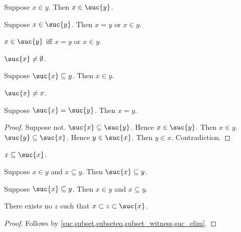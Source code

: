 \begin{proposition}\label{suc_intro_in}
    Suppose $x\in y$. Then $x\in\suc{y}$.
\end{proposition}

\begin{proposition}\label{suc_elim}
    Suppose $x\in\suc{y}$.
    Then $x = y$ or $x\in y$.
\end{proposition}

\begin{proposition}\label{suc_iff}
    $x\in\suc{y}$ iff $x = y$ or $x\in y$.
\end{proposition}

\begin{proposition}\label{suc_neq_emptyset}
    $\suc{x}\neq \emptyset$.
\end{proposition}

\begin{proposition}\label{suc_subseteq_implies_in}
    Suppose $\suc{x}\subseteq y$. Then $x\in y$.
\end{proposition}

\begin{proposition}\label{suc_neq_self}
    $\suc{x}\neq x$.
\end{proposition}

\begin{proposition}\label{suc_injective}
    Suppose $\suc{x} = \suc{y}$. Then $x = y$.
\end{proposition}
\begin{proof}
    Suppose not.
    $\suc{x}\subseteq \suc{y}$. Hence $x\in\suc{y}$.
    Then $x\in y$.
    $\suc{y}\subseteq \suc{x}$. Hence $y\in\suc{x}$.
    Then $y\in x$.
    Contradiction.
\end{proof}

\begin{proposition}\label{subseteq_self_suc_intro}
    $x\subseteq\suc{x}$.
\end{proposition}

\begin{proposition}\label{suc_subseteq_intro}
    Suppose $x\in y$ and $x\subseteq y$.
    Then $\suc{x}\subseteq y$.
\end{proposition}

\begin{proposition}\label{suc_subseteq_elim}
    Suppose $\suc{x}\subseteq y$.
    Then $x\in y$ and $x\subseteq y$.
\end{proposition}

\begin{proposition}\label{suc_next_subset}
    There exists no $z$ such that $x\subset z\subset \suc{x}$.
\end{proposition}
\begin{proof}
    Follows by \cref{suc,subset,subseteq,subset_witness,suc_elim}.
\end{proof}

